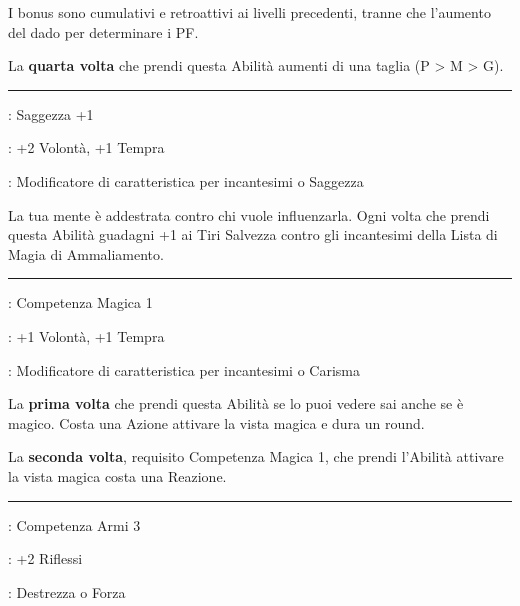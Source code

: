 \begin{multicols}{2}
I bonus sono cumulativi e retroattivi ai livelli precedenti, tranne che l'aumento del dado per determinare i PF.

La \textbf{quarta volta} che prendi questa Abilità aumenti di una taglia (P > M > G).

\smallskip\noindent\rule{\linewidth}{2pt} \hypertarget{Muro mentale}{}\medskip{}
\noindent
\begin{description}[noitemsep, topsep=0pt, parsep=0pt, partopsep=0pt, leftmargin=0cm, labelwidth=2.5cm]
    \item[\textbf{Requisito}]: Saggezza +1
    \item[\textbf{Tiri Salvezza}]: +2 Volontà, +1 Tempra
    \item[\textbf{Caratteristica}]: Modificatore di caratteristica per incantesimi o Saggezza
\end{description}

La tua mente è addestrata contro chi vuole influenzarla. Ogni volta che prendi questa Abilità guadagni +1 ai Tiri Salvezza contro gli incantesimi della Lista di Magia di Ammaliamento.

\smallskip\noindent\rule{\linewidth}{2pt} \hypertarget{Occhi della magia}{}\medskip{}
\noindent
\begin{description}[noitemsep, topsep=0pt, parsep=0pt, partopsep=0pt, leftmargin=0cm, labelwidth=2.5cm]
    \item[\textbf{Requisito}]: Competenza Magica 1
    \item[\textbf{Tiri Salvezza}]: +1 Volontà, +1 Tempra
    \item[\textbf{Caratteristica}]: Modificatore di caratteristica per incantesimi o Carisma
\end{description}

La \textbf{prima volta} che prendi questa Abilità se lo puoi vedere sai anche se è magico. Costa una Azione attivare la vista magica e dura un round.

La \textbf{seconda volta}, requisito Competenza Magica 1, che prendi l'Abilità attivare la vista magica costa una Reazione.
\smallskip\noindent\rule{\linewidth}{2pt} \hypertarget{Occhio Clinico}{}\medskip{}
\noindent
\begin{description}[noitemsep, topsep=0pt, parsep=0pt, partopsep=0pt, leftmargin=0cm, labelwidth=2.5cm]
    \item[\textbf{Requisito}]: Competenza Armi 3
    \item[\textbf{Tiri Salvezza}]: +2 Riflessi
    \item[\textbf{Caratteristica}]: Destrezza o Forza
\end{description}


\end{multicols}
